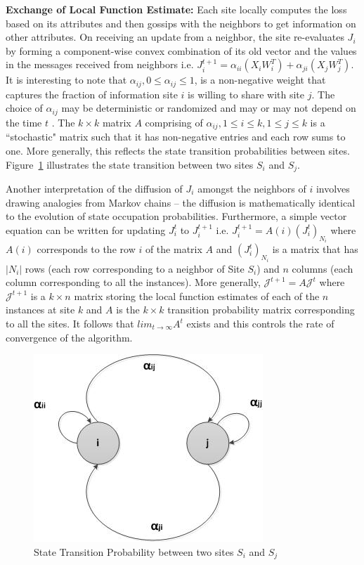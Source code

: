 \noindent \textbf{Exchange of Local Function Estimate:}  Each site locally computes the loss based on its attributes and then gossips with the neighbors to get information on other attributes.
On receiving an update from a neighbor, the site re-evaluates $J_i$ by forming a component-wise convex combination of its old vector and the values in the messages received from neighbors i.e.   
 $J_i^{t+1}=\alpha_{ii}(X_i W_i^T) + \alpha_{ji} (X_j W_j^T)$. 
It is interesting to note that $\alpha_{ij}, 0 \le \alpha_{ij} \le 1$, is a non-negative weight that captures the fraction of information site $i$ is willing to share with site $j$. The choice of $\alpha_{ij}$ may be deterministic or randomized and may or may not depend on the time $t$ \cite{Kempe_03}. The $k\times k$ matrix $A$ comprising of $\alpha_{ij}, 1 \le i \le k, 1 \le j \le k$ is a ``stochastic" matrix such that it has non-negative entries and each row sums to one. More generally, this reflects the state transition probabilities between sites. Figure~\ref{stateTrans} illustrates the state transition between two sites $S_i$ and $S_j$. 

Another interpretation of the diffusion of $J_i$ amongst the neighbors of $i$ involves drawing analogies from Markov chains -- the diffusion is mathematically identical to the evolution of state occupation probabilities. Furthermore, a simple vector equation can be written for updating $J_i^t$ to $J_i^{t+1}$ i.e. $J_i^{t+1} = A(i) (J_i^t)_{N_i}$ where $A(i)$ corresponds to the row $i$ of the matrix $A$ and $(J_i^t)_{N_i}$ is a matrix that has $|N_i|$ rows (each row corresponding to a neighbor of Site $S_i$) and $n$ columns (each column corresponding to all the instances). More generally, $\mathcal{J}^{t+1} = A \mathcal{J}^{t}$ where $\mathcal{J}^{t+1}$ is a $k \times n$ matrix storing the local function estimates of each of the $n$ instances at site $k$ and $A$ is the $k \times k$ transition probability matrix corresponding to all the sites. It follows that $lim_{t \rightarrow \infty} A^t$ exists and this controls the rate of convergence of the algorithm. 

\begin{figure}[t]
\centerline{\includegraphics[height=0.28\textheight]{stateTrans.jpg}}
\caption{State Transition Probability between two sites $S_i$ and $S_j$}
\label{stateTrans}
\end{figure}

